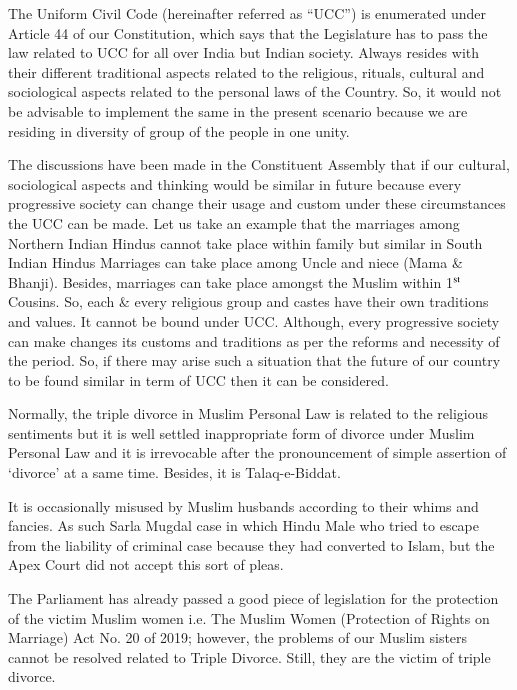 \setcounter{figure}{0}
\setcounter{table}{0}
\setcounter{footnote}{0}


\begin{multicols}{2}


\noi
The Uniform Civil Code (hereinafter referred as “UCC”) is enumerated under Article 44 of
our Constitution, which says that the Legislature has to pass the law related to UCC for all
over India but Indian society. Always resides with their different traditional aspects related to
the religious, rituals, cultural and sociological aspects related to the personal laws of the
Country. So, it would not be advisable to implement the same in the present scenario because
we are residing in diversity of group of the people in one unity.


The discussions have been made in the Constituent Assembly that if our cultural, sociological
aspects and thinking would be similar in future because every progressive society can change
their usage and custom under these circumstances the UCC can be made. Let us take an
example that the marriages among Northern Indian Hindus cannot take place within family
but similar in South Indian Hindus Marriages can take place among Uncle and niece (Mama
\& Bhanji). Besides, marriages can take place amongst the Muslim within 1$^{\rm st}$ Cousins. So,
each \& every religious group and castes have their own traditions and values. It cannot be
bound under UCC. Although, every progressive society can make changes its customs and
traditions as per the reforms and necessity of the period. So, if there may arise such a
situation that the future of our country to be found similar in term of UCC then it can be
considered.

Normally, the triple divorce in Muslim Personal Law is related to the religious sentiments but
it is well settled inappropriate form of divorce under Muslim Personal Law and it is
irrevocable after the pronouncement of simple assertion of ‘divorce’ at a same time. Besides,
it is Talaq-e-Biddat.

It is occasionally misused by Muslim husbands according to their whims and fancies. As such
Sarla Mugdal case in which Hindu Male who tried to escape from the liability of criminal case because they had converted to Islam, but the Apex Court did not accept this sort of
pleas.

The Parliament has already passed a good piece of legislation for the protection of the victim
Muslim women i.e. The Muslim Women (Protection of Rights on Marriage) Act No. 20 of
2019; however, the problems of our Muslim sisters cannot be resolved related to Triple
Divorce. Still, they are the victim of triple divorce. 


\end{multicols}
